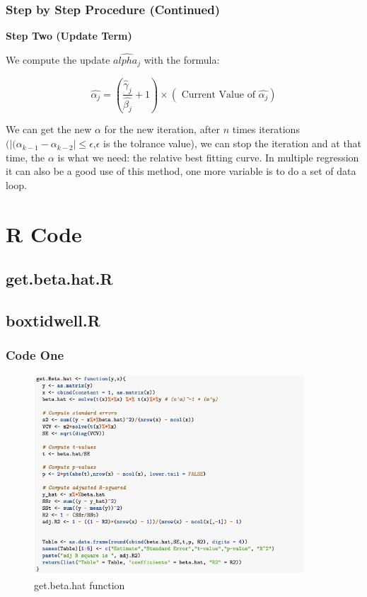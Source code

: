 \documentclass[10pt,aspectratio=32]{beamer}
\begin{document}
\begin{frame}
 	\frametitle{Step by Step Procedure (Continued)}
 \textbf{Step Two (Update Term)}

 We compute the update $\hat{alpha_j}$ with the formula:

 $$
 	\hat{\alpha_j} = (\frac{\hat{\gamma}_j}{\hat{\beta_j}} + 1) \times (\text{ Current Value of } \hat{\alpha_j})
 $$

We can get the new $\alpha$ for the new iteration, after $n$ times iterations $(|(\alpha_{k-1} - \alpha_{k-2}| \leq \epsilon$,$\epsilon$ is the tolrance value), we can stop the iteration and at that time, the $\alpha$ is what we need: the relative best fitting curve. In multiple regression it can also be a good use of this method, one more variable is to do a set of data loop.
\end{frame}



\section{R Code}
\subsection{get.beta.hat.R}
\subsection{boxtidwell.R}

\begin{frame}
 \frametitle{Code One}
 \vspace{-0.3cm}
	\begin{figure}[get.beta.hat]
		\centering
		\includegraphics[width=0.9\textwidth]{get.png}
		\caption{get.beta.hat function}
	\end{figure}
\end{frame}
\end{document}
